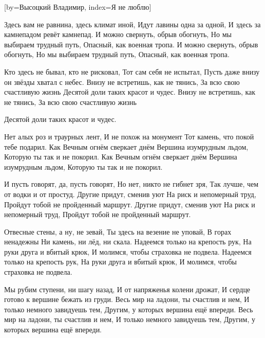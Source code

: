 [by={Высоцкий Владимир},
                     index={Я не люблю}]
\beginverse

Здесь вам не равнина, здесь климат иной,
Идут лавины одна за одной,
И здесь за камнепадом ревёт камнепад.
И можно свернуть, обрыв обогнуть,
Но мы выбираем трудный путь,
Опасный, как военная тропа.
И можно свернуть, обрыв обогнуть,
Но мы выбираем трудный путь,
Опасный, как военная тропа.

\endverse
\beginverse

Кто здесь не бывал, кто не рисковал,
Тот сам себя не испытал,
Пусть даже внизу он звёзды хватал с небес.
Внизу не встретишь, как не тянись,
За всю свою счастливую жизнь
Десятой доли таких красот и чудес.
Внизу не встретишь, как не тянись,
За всю свою счастливую жизнь

\endverse
\beginverse

Десятой доли таких красот и чудес.

\endverse
\beginverse

Нет алых роз и траурных лент,
И не похож на монумент
Тот камень, что покой тебе подарил.
Как Вечным огнём сверкает днём
Вершина изумрудным льдом,
Которую ты так и не покорил.
Как Вечным огнём сверкает днём
Вершина изумрудным льдом,
Которую ты так и не покорил.

\endverse
\beginverse

И пусть говорят, да, пусть говорят,
Но нет, никто не гибнет зря,
Так лучше, чем от водки и от простуд.
Другие придут, сменив уют
На риск и непомерный труд,
Пройдут тобой не пройденный маршрут.
Другие придут, сменив уют
На риск и непомерный труд,
Пройдут тобой не пройденный маршрут.

\endverse
\beginverse

Отвесные стены, а ну, не зевай,
Ты здесь на везение не уповай,
В горах ненадежны
Ни камень, ни лёд, ни скала.
Надеемся только на крепость рук,
На руки друга и вбитый крюк,
И молимся, чтобы страховка не подвела.
Надеемся только на крепость рук,
На руки друга и вбитый крюк,
И молимся, чтобы страховка не подвела.

\endverse
\beginverse

Мы рубим ступени, ни шагу назад,
И от напряженья колени дрожат,
И сердце готово к вершине бежать из груди.
Весь мир на ладони, ты счастлив и нем,
И только немного завидуешь тем,
Другим, у которых вершина ещё впереди.
Весь мир на ладони, ты счастлив и нем,
И только немного завидуешь тем,
Другим, у которых вершина ещё впереди.

\endverse
\endsong